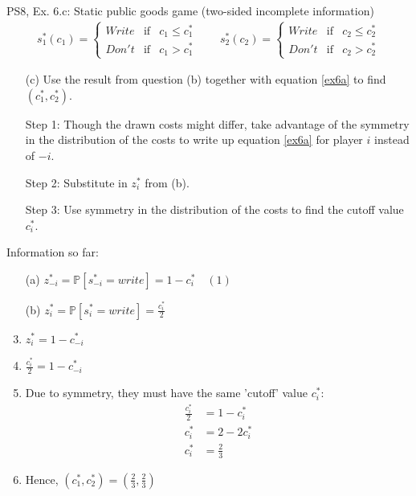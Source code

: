 \begin{frame}{PS8, Ex. 6.c: Static public goods game (two-sided incomplete information)}
    \begin{align*}
      s_1^*(c_1)=\left\{\begin{array}{rcl}
        Write & \text{if} & c_1\leq c_1^*\\
        Don't & \text{if} & c_1>c_1^*
        \end{array}\right.\quad\quad
      s_2^*(c_2)=\left\{\begin{array}{rcl}
        Write & \text{if} & c_2\leq c_2^*\\
        Don't & \text{if} & c_2>c_2^*
        \end{array}\right.
    \end{align*}
    \vspace{-8pt}
    \begin{itemize}
      \item[(c)] Use the result from question (b) together with equation \eqref{ex6a} to find $(c_1^* , c_2^*)$.
    \end{itemize}
    \vspace{-4pt}
    \begin{multicols}{2}
      \begin{itemize}
        \item[Step 1:] Though the drawn costs might differ, take advantage of the symmetry in the distribution of the costs to write up equation \eqref{ex6a} for player $i$ instead of $-i$.
        \item[Step 2:] Substitute in $z_i^*$ from (b).
        \item[Step 3:] Use symmetry in the distribution of the costs to find the cutoff value $c_i^*$.
      \end{itemize}
      \vfill\null\columnbreak
      Information so far:
      \begin{enumerate}
        \item[(a)] $z_{-i}^*=\mathbb{P}[s_{-i}^*=write]=1-c_i^*\quad(1)$
        \item[(b)] $z_i^*=\mathbb{P}[s_i^*=write]=\frac{c_i^*}{2}$
        \item      $z_i^*=1-c_{-i}^*$
        \item      $\frac{c_i^*}{2}=1-c_{-i}^*$
        \item      Due to symmetry, they must have the same 'cutoff' value $c_i^*$:\vspace{-8pt}
                   \begin{align*}
                     \frac{c_i^*}{2}&=1-c_{i}^*\\
                     c_i^*&=2-2c_{i}^*\\
                     c_i^*&=\frac{2}{3}
                   \end{align*}
        \item      Hence, $(c_1^* , c_2^*)=\left(\frac{2}{3},\frac{2}{3}\right)$
      \end{enumerate}
      \vfill\null
    \end{multicols}
\end{frame}


